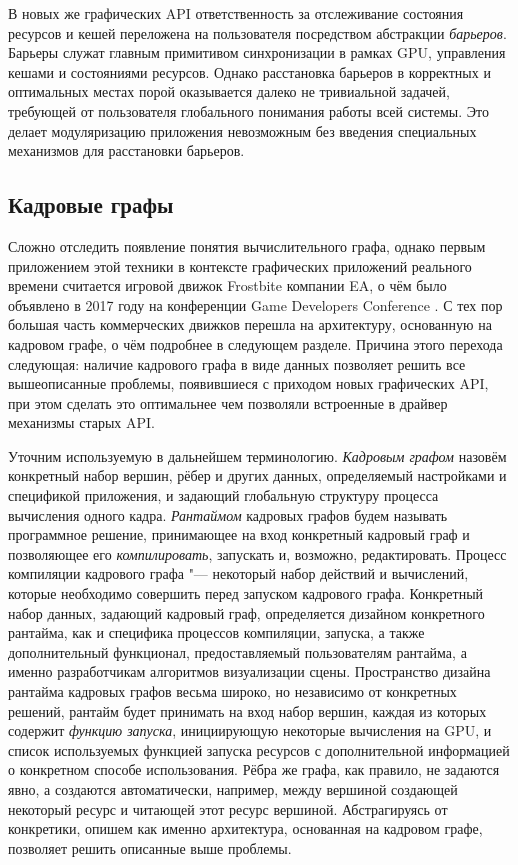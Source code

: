 В новых же графических API ответственность за отслеживание состояния ресурсов и кешей переложена на пользователя посредством абстракции \textit{барьеров}.
Барьеры служат главным примитивом синхронизации в рамках GPU, управления кешами и состояниями ресурсов.
Однако расстановка барьеров в корректных и оптимальных местах порой оказывается далеко не тривиальной задачей, требующей от пользователя глобального понимания работы всей системы.
Это делает модуляризацию приложения невозможным без введения специальных механизмов для расстановки барьеров.

\subsection{Кадровые графы}
Сложно отследить появление понятия вычислительного графа, однако первым приложением этой техники в контексте графических приложений реального времени считается игровой движок Frostbite компании EA, о чём было объявлено в 2017 году на конференции Game Developers Conference \cite{FrostbiteGdcTalk}.
С тех пор большая часть коммерческих движков перешла на архитектуру, основанную на кадровом графе, о чём подробнее в следующем разделе.
Причина этого перехода следующая: наличие кадрового графа в виде данных позволяет решить все вышеописанные проблемы, появившиеся с приходом новых графических API, при этом сделать это оптимальнее чем позволяли встроенные в драйвер механизмы старых API.

Уточним используемую в дальнейшем терминологию.
\textit{Кадровым графом} назовём конкретный набор вершин, рёбер и других данных, определяемый настройками и спецификой приложения, и задающий глобальную структуру процесса вычисления одного кадра.
\textit{Рантаймом} кадровых графов будем называть программное решение, принимающее на вход конкретный кадровый граф и позволяющее его \textit{компилировать}, запускать и, возможно, редактировать.
Процесс компиляции кадрового графа "--- некоторый набор действий и вычислений, которые необходимо совершить перед запуском кадрового графа.
Конкретный набор данных, задающий кадровый граф, определяется дизайном конкретного рантайма, как и специфика процессов компиляции, запуска, а также дополнительный функционал, предоставляемый пользователям рантайма, а именно разработчикам алгоритмов визуализации сцены.
Пространство дизайна рантайма кадровых графов весьма широко, но независимо от конкретных решений, рантайм будет принимать на вход набор вершин, каждая из которых содержит \textit{функцию запуска}, инициирующую некоторые вычисления на GPU, и список используемых функцией запуска ресурсов с дополнительной информацией о конкретном способе использования.
Рёбра же графа, как правило, не задаются явно, а создаются автоматически, например, между вершиной создающей некоторый ресурс и читающей этот ресурс вершиной.
Абстрагируясь от конкретики, опишем как именно архитектура, основанная на кадровом графе, позволяет решить описанные выше проблемы.


